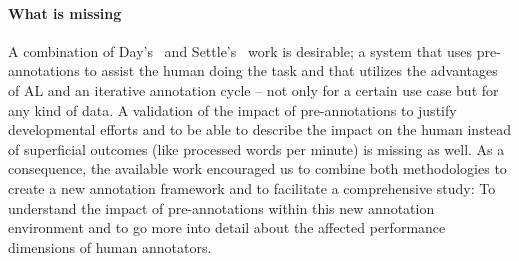   \paragraph{What is missing} A combination of Day's~\cite{day1997mixed} and Settle's~\cite{settles2011closing} work is desirable; a system that uses pre-annotations to assist the human doing the task and that utilizes the advantages of \ac{AL} and an iterative annotation cycle -- not only for a certain use case but for any kind of data. A validation of the impact of pre-annotations to justify developmental efforts and to be able to describe the impact on the human instead of superficial outcomes (like processed words per minute) is missing as well. As a consequence, the available work encouraged us to combine both methodologies to create a new annotation framework and to facilitate a comprehensive study: To understand the impact of pre-annotations within this new annotation environment and to go more into detail about the affected performance dimensions of human annotators.

  \pagebreak
